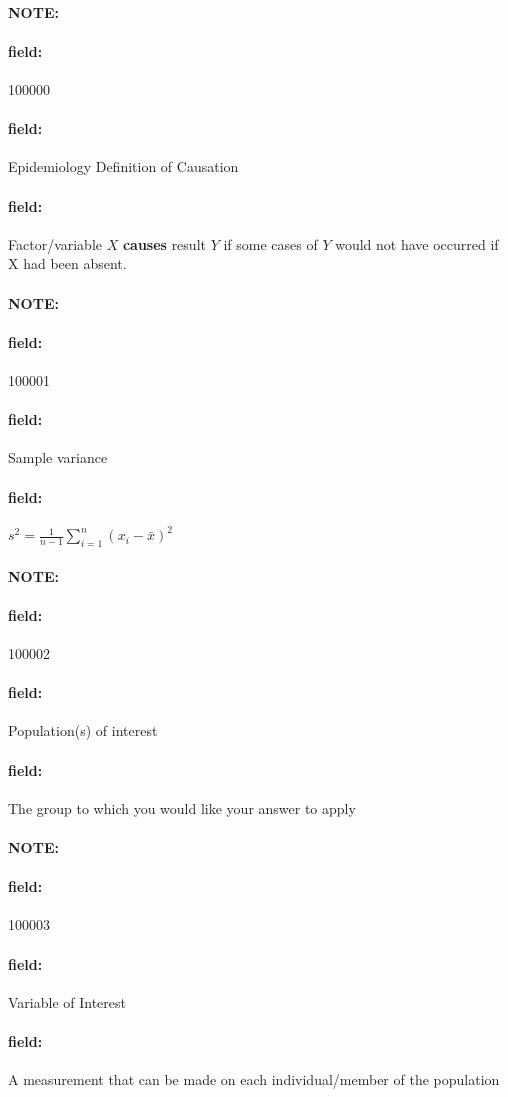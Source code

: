 \documentclass[12pt]{article}
\newenvironment{note}{\paragraph{NOTE:}}{}
\newenvironment{field}{\paragraph{field:}}{}
\begin{document}
\begin{note} \begin{field} \tiny 100000 \end{field}
 \begin{field}
  Epidemiology Definition of Causation
 \end{field}
 \begin{field}
  Factor/variable $X$ \textbf{causes} result $Y$ if some cases of $Y$ would not have occurred if X had been absent.
 \end{field}
\end{note}

\begin{note} \begin{field} \tiny 100001 \end{field}
 \begin{field}
  Sample variance
 \end{field}
 \begin{field}
  $s^2 = \frac{1}{n-1}\sum_{i=1}^n(x_i - \bar{x})^2$
 \end{field}
\end{note}

\begin{note} \begin{field} \tiny 100002 \end{field}
 \begin{field}
  Population(s) of interest
 \end{field}
 \begin{field}
  The group to which you would like your answer to apply
 \end{field}
\end{note}

\begin{note} \begin{field} \tiny 100003 \end{field}
 \begin{field}
  Variable of Interest
 \end{field}
 \begin{field}
  A measurement that can be made on each individual/member of the population
 \end{field}
\end{note}
\end{document}

